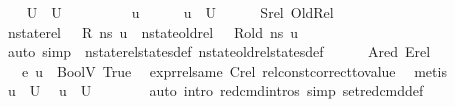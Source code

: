 \begin{isabellebody}
\isamarkupfalse%
\isanewline
\ \ \isamarkupfalse%
\ {\isachardoublequoteopen}U\ {\isasymsubseteq}\ {\isacharquery}{\kern0pt}U{\isacharprime}{\kern0pt}{\isachardoublequoteclose}\ \isanewline
\ \ \isamarkupfalse%
\isanewline
\ \ \ \ \isamarkupfalse%
\ u\isanewline
\ \ \ \ \isamarkupfalse%
\ {\isachardoublequoteopen}u\ {\isasymin}\ U{\isachardoublequoteclose}\isanewline
\ \ \ \ \isamarkupfalse%
\ Srel\ OldRel\ \isamarkupfalse%
\ {\isachardoublequoteopen}nstate{\isacharunderscore}{\kern0pt}rel\ {\isasymLambda}\ {\isasymLambda}{\isacharprime}{\kern0pt}\ R\ ns\ u{\isachardoublequoteclose}\ \ {\isachardoublequoteopen}nstate{\isacharunderscore}{\kern0pt}old{\isacharunderscore}{\kern0pt}rel\ {\isasymLambda}\ {\isasymLambda}{\isacharprime}{\kern0pt}\ R{\isacharunderscore}{\kern0pt}old\ ns\ u{\isachardoublequoteclose}\ \ \ \ \isanewline
\ \ \ \ \ \ \isamarkupfalse%
\ {\isacharparenleft}{\kern0pt}auto\ simp{\isacharcolon}{\kern0pt}\ \ nstate{\isacharunderscore}{\kern0pt}rel{\isacharunderscore}{\kern0pt}states{\isacharunderscore}{\kern0pt}def\ nstate{\isacharunderscore}{\kern0pt}old{\isacharunderscore}{\kern0pt}rel{\isacharunderscore}{\kern0pt}states{\isacharunderscore}{\kern0pt}def{\isacharparenright}{\kern0pt}\isanewline
\ \ \ \ \isamarkupfalse%
\ Ared\ Erel\ \isamarkupfalse%
\ {\isachardoublequoteopen}{\isasymLambda}{\isacharprime}{\kern0pt}{\isacharcomma}{\kern0pt}{\isasymGamma}{\isacharcomma}{\kern0pt}{\isasymOmega}\ {\isasymturnstile}\ {\isasymlangle}e{}{\isacharcomma}{\kern0pt}\ u{\isasymrangle}\ {\isasymDown}\ {\isacharparenleft}{\kern0pt}BoolV\ True{\isacharparenright}{\kern0pt}{\isachardoublequoteclose}\ \isamarkupfalse%
\ expr{\isacharunderscore}{\kern0pt}rel{\isacharunderscore}{\kern0pt}same{\isacharparenleft}{\kern0pt}{}{\isacharparenright}{\kern0pt}\ Crel\ rel{\isacharunderscore}{\kern0pt}const{\isacharunderscore}{\kern0pt}correct{\isacharunderscore}{\kern0pt}to{\isacharunderscore}{\kern0pt}value\ \isamarkupfalse%
\ metis\isanewline
\ \ \ \ \isamarkupfalse%
\ {\isacartoucheopen}u\ {\isasymin}\ U{\isacartoucheclose}\ \isamarkupfalse%
\ {\isachardoublequoteopen}u\ {\isasymin}\ {\isacharquery}{\kern0pt}U{\isacharprime}{\kern0pt}{\isachardoublequoteclose}\isanewline
\ \ \ \ \ \ \isamarkupfalse%
\ {\isacharparenleft}{\kern0pt}auto\ intro{\isacharbang}{\kern0pt}{\isacharcolon}{\kern0pt}\ red{\isacharunderscore}{\kern0pt}cmd{\isachardot}{\kern0pt}intros\ simp{\isacharcolon}{\kern0pt}\ set{\isacharunderscore}{\kern0pt}red{\isacharunderscore}{\kern0pt}cmd{\isacharunderscore}{\kern0pt}def{\isacharparenright}{\kern0pt}\isanewline

\end{isabellebody}

